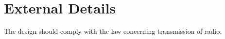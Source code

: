 \documentclass{memoir}
\begin{document}
\chapter{External Details}
The design should comply with the law concerning transmission of radio.
\end{document}
